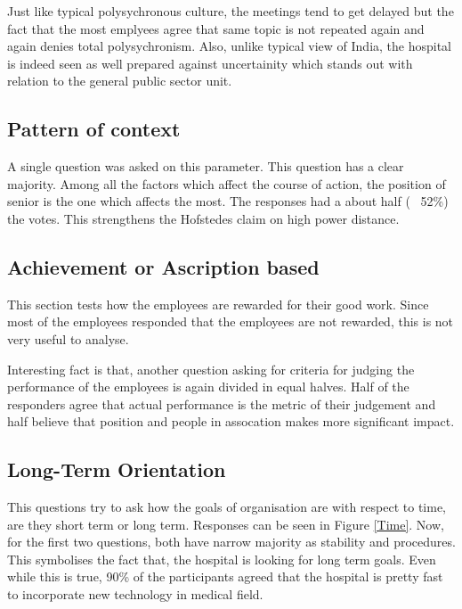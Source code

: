 \documentclass{article}
\begin{document}
Just like typical polysychronous culture, the meetings tend to get delayed but the fact that the most emplyees agree that same topic is not repeated again and again denies total polysychronism. Also, unlike typical view of India, the hospital is indeed seen as well prepared against uncertainity which stands out with relation to the general public sector unit.

\subsection{Pattern of context}

A single question was asked on this parameter. This question has a clear majority. Among all the factors which affect the course of action, the position of senior is the one which affects the most. The responses had a about half (~ 52\%) the votes. This strengthens the Hofstedes claim on high power distance.

\subsection{Achievement or Ascription based}

This section tests how the employees are rewarded for their good work. Since most of the employees responded that the employees are not rewarded, this is not very useful to analyse.

Interesting fact is that, another question asking for criteria for judging the performance of the employees is again divided in equal halves. Half of the responders agree that actual performance is the metric of their judgement and half believe that position and people in assocation makes more significant impact.

\subsection{Long-Term Orientation}

This questions try to ask how the goals of organisation are with respect to time, are they short term or long term. Responses can be seen in Figure \ref{Time}. Now, for the first two questions, both have narrow majority as stability and procedures. This symbolises the fact that, the hospital is looking for long term goals. Even while this is true, 90\% of the participants agreed that the hospital is pretty fast to incorporate new technology in medical field.
\end{document}
